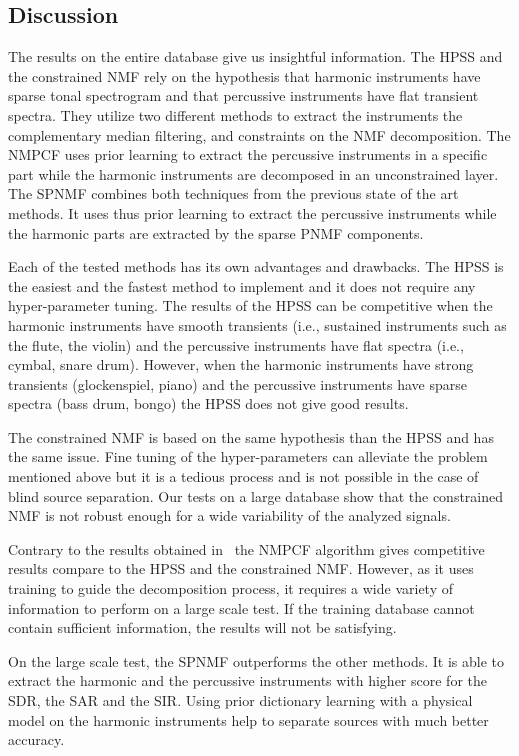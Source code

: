 \subsection{Discussion}
\label{discu}

The results on the entire database give us insightful information.
The HPSS and the constrained NMF rely on the hypothesis that harmonic instruments have sparse tonal spectrogram and that percussive instruments have flat transient spectra. They utilize two different methods to extract the instruments the complementary median filtering, and constraints on the NMF decomposition.
The NMPCF uses prior learning to extract the percussive instruments in a specific part while the harmonic instruments are decomposed in an unconstrained layer. 
The SPNMF combines both techniques from the previous state of the art methods. It uses thus prior learning to extract the percussive instruments while the harmonic parts are extracted by the sparse PNMF components.



Each of the tested methods has its own advantages and  drawbacks. The HPSS is the easiest and the fastest method to implement and it does not require any hyper-parameter tuning. The results of the HPSS can be competitive when the harmonic instruments have smooth transients (i.e., sustained instruments such as the flute, the violin) and the percussive instruments have flat spectra (i.e., cymbal, snare drum). However, when the harmonic instruments have strong transients (glockenspiel, piano) and the percussive instruments have sparse spectra (bass drum, bongo) the HPSS does not give good results. 

The constrained NMF is based on the same hypothesis than the HPSS and has the same issue. Fine tuning of the hyper-parameters can alleviate the problem mentioned above but it is a tedious process and is not possible in the case of blind source separation. Our tests on a large database show that the constrained NMF is not robust enough for a wide variability of the analyzed signals.

Contrary to the results obtained in~\cite{canadas2014percussive} the NMPCF algorithm gives competitive results compare to the HPSS and the constrained NMF. However, as it uses training to guide the decomposition process, it requires a wide variety of information to perform on a large scale test. If the training database cannot contain sufficient information, the results will not be satisfying. 

On the large scale test, the SPNMF outperforms the other methods. It is able to extract the harmonic and the percussive instruments with higher score for the SDR, the SAR and the SIR. Using prior dictionary learning with a physical model on the harmonic instruments help to separate sources with much better accuracy.


